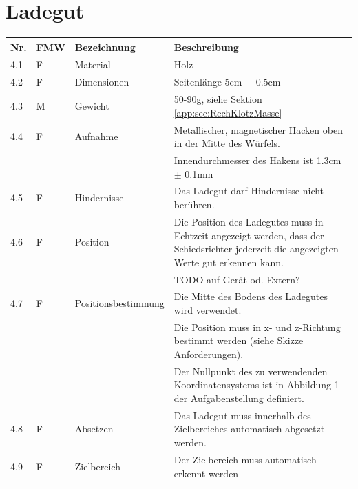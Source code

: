 \documentclass[a4paper]{report}
\begin{document}
\section{Ladegut}
\label{app:sec:AnfLadegut}
\begin{tabular}{|p{}|p{}|p{}|p{}|}
	\hline
	\textbf{Nr.} & \textbf{FMW\footnotemark} & \textbf{Bezeichnung} & \textbf{Beschreibung} \\
	\hline
	4.1 & F & Material & Holz \\
	\hline
	4.2 & F &  Dimensionen & Seitenlänge 5cm $\pm$ 0.5cm \\
	\hline
	4.3 & M & Gewicht & 50-90g, siehe Sektion \ref{app:sec:RechKlotzMasse} \\
	\hline
	4.4 & F & Aufnahme & Metallischer, magnetischer Hacken oben in der Mitte des Würfels.\\
	& & & Innendurchmesser des Hakens ist 1.3cm $\pm$ 0.1mm\\
	\hline
	4.5 & F & Hindernisse & Das Ladegut darf Hindernisse nicht berühren. \\
	\hline
	4.6 & F & Position & Die Position des Ladegutes muss in Echtzeit angezeigt werden, dass der Schiedsrichter jederzeit die angezeigten Werte gut erkennen kann.\\
	& & & TODO auf Gerät od. Extern? \\
	\hline
	4.7 & F & Positionsbestimmung & Die Mitte des Bodens des Ladegutes wird verwendet.\\
	& & & Die Position muss in x- und z-Richtung bestimmt werden (siehe Skizze Anforderungen).\\
	& & & Der Nullpunkt des zu verwendenden Koordinatensystems ist in Abbildung 1 der Aufgabenstellung definiert. \\
	\hline
	4.8 & F & Absetzen & Das Ladegut muss innerhalb des Zielbereiches automatisch abgesetzt werden. \\
	\hline
	4.9 & F & Zielbereich & Der Zielbereich muss automatisch erkennt werden\\
	\hline
\end{tabular}
\end{document}
